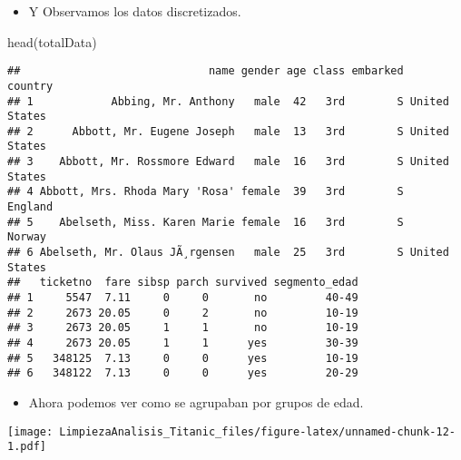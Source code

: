 \documentclass[
]{article}
\newenvironment{Shaded}{\begin{snugshade}}{\end{snugshade}}
\newcommand{\AttributeTok}[1]{\textcolor[rgb]{0.80,0.80,0.80}{#1}}
\newcommand{\FunctionTok}[1]{\textcolor[rgb]{0.94,0.94,0.56}{#1}}
\newcommand{\NormalTok}[1]{\textcolor[rgb]{0.80,0.80,0.80}{#1}}
\newcommand{\SpecialCharTok}[1]{\textcolor[rgb]{0.86,0.64,0.64}{#1}}
\newcommand{\StringTok}[1]{\textcolor[rgb]{0.80,0.58,0.58}{#1}}
\providecommand{\tightlist}{%
  \setlength{\itemsep}{0pt}\setlength{\parskip}{0pt}}
\begin{document}
\begin{itemize}
\tightlist
\item
  Y Observamos los datos discretizados.
\end{itemize}

\begin{Shaded}
\begin{Highlighting}[]
\FunctionTok{head}\NormalTok{(totalData)}
\end{Highlighting}
\end{Shaded}

\begin{verbatim}
##                             name gender age class embarked       country
## 1            Abbing, Mr. Anthony   male  42   3rd        S United States
## 2      Abbott, Mr. Eugene Joseph   male  13   3rd        S United States
## 3    Abbott, Mr. Rossmore Edward   male  16   3rd        S United States
## 4 Abbott, Mrs. Rhoda Mary 'Rosa' female  39   3rd        S       England
## 5    Abelseth, Miss. Karen Marie female  16   3rd        S        Norway
## 6 Abelseth, Mr. Olaus JÃ¸rgensen   male  25   3rd        S United States
##   ticketno  fare sibsp parch survived segmento_edad
## 1     5547  7.11     0     0       no         40-49
## 2     2673 20.05     0     2       no         10-19
## 3     2673 20.05     1     1       no         10-19
## 4     2673 20.05     1     1      yes         30-39
## 5   348125  7.13     0     0      yes         10-19
## 6   348122  7.13     0     0      yes         20-29
\end{verbatim}

\begin{itemize}
\tightlist
\item
  Ahora podemos ver como se agrupaban por grupos de edad.
\end{itemize}

\begin{Shaded}
\end{Shaded}

\texttt{[image: LimpiezaAnalisis\_Titanic\_files/figure-latex/unnamed-chunk-12-1.pdf]}
\end{document}
